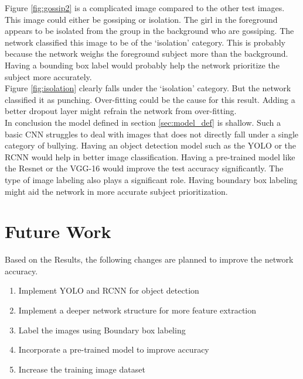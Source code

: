 \documentclass[12pt]{article}
\begin{document}
Figure \ref{fig:gossip2} is a complicated image compared to the other test images. This image could either be gossiping or isolation. The girl in the foreground appears to be isolated from the group in the background who are gossiping. The network classified this image to be of the \lq{isolation}\rq{} category. This is probably because the network weighs the foreground subject more than the background. Having a bounding box label would probably help the network prioritize the subject more accurately. \\

Figure \ref{fig:isolation} clearly falls under the \lq{isolation}\rq{} category. But the network classified it as punching. Over-fitting could be the cause for this result. Adding a better dropout layer might refrain the network from over-fitting. \\

In conclusion the model defined in section \ref{sec:model_def} is shallow. Such a basic CNN struggles to deal with images that does not directly fall under a single category of bullying. Having an object detection model such as the YOLO or the RCNN would help in better image classification. Having a pre-trained model like the Resnet or the VGG-16 would improve the test accuracy significantly. The type of image labeling also plays a significant role. Having boundary box labeling might aid the network in more accurate subject prioritization.   


\section{Future Work}
Based on the Results, the following changes are planned to improve the network accuracy. 
\begin{enumerate}
	\item Implement YOLO and RCNN for object detection
	\item Implement a deeper network structure for more feature extraction
	\item Label the images using Boundary box labeling
	\item Incorporate a pre-trained model to improve accuracy
	\item Increase the training image dataset
\end{enumerate}


 
 
\newpage
\end{document}
